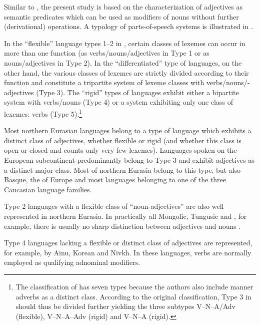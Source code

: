Similar to \textcite{hengeveld-etal2004}, the present study is based on the characterization of adjectives as semantic predicates which can be used as modifiers of nouns without further (derivational) operations. A typology of parts-of-speech systems is illustrated in .

In the “flexible” language types 1–2 in , certain classes of lexemes can occur in more than one function (as verbs/nouns/adjectives in Type 1 or as nouns/adjectives in Type 2). In the “differentiated” type of languages, on the other hand, the various classes of lexemes are strictly divided according to their function and constitute a tripartite system of lexeme classes with verbs\fshyp{}nouns\fshyp{}adjectives (Type 3). The “rigid” types of languages exhibit either a bipartite system with verbs/nouns (Type 4) or a system exhibiting only one class of lexemes: verbs (Type 5).\footnote{The classification of \textcite{hengeveld-etal2004} has seven types because the authors also include manner adverbs as a distinct class. According to the original classification, Type 3 in  should thus be divided further yielding the three subtypes V–N–A/Adv (flexible), V–N–A–Adv (rigid) and V–N–A (rigid).} 

Most northern Eurasian languages belong to a type of language which exhibits a distinct class of adjectives, whether flexible or rigid (and whether this class is open or closed and counts only very few lexemes). Languages spoken on the European subcontinent predominantly belong to Type 3 and exhibit adjectives as a distinct major class. Most  of northern Eurasia belong to this type, but also Basque, the  of Europe and most languages belonging to one of the three Caucasian language families.

Type 2 languages with a flexible class of “noun-adjectives” are also well represented in northern Eurasia. In practically all Mongolic, Tungusic and , for example, there is usually no sharp distinction between adjectives and nouns \parencites[122–123]{rijkhoff2002}[9]{poppe1964}.

Type 4 languages lacking a flexible or distinct class of adjectives are represented, for example, by Ainu, Korean and Nivkh. In these languages, verbs are normally employed as qualifying adnominal modifiers.

